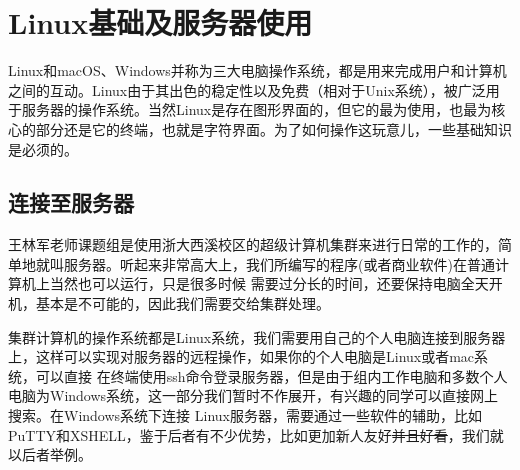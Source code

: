 \documentclass{article}
\numberwithin{equation}{section}
\begin{document}
    \section{Linux基础及服务器使用}
    Linux和macOS、Windows并称为三大电脑操作系统，都是用来完成用户和计算机之间的互动。Linux由于其出色的稳定性以及免费（相对于Unix系统），被广泛用于服务器的操作系统。当然Linux是存在图形界面的，但它的最为使用，也最为核心的部分还是它的终端，也就是字符界面。为了如何操作这玩意儿，一些基础知识是必须的。

    \subsection{连接至服务器}
    王林军老师课题组是使用浙大西溪校区的超级计算机集群来进行日常的工作的，简单地就叫服务器。听起来非常高大上，我们所编写的程序(或者商业软件)在普通计算机上当然也可以运行，只是很多时候
    需要过分长的时间，还要保持电脑全天开机，基本是不可能的，因此我们需要交给集群处理。

    集群计算机的操作系统都是Linux系统，我们需要用自己的个人电脑连接到服务器上，这样可以实现对服务器的远程操作，如果你的个人电脑是Linux或者mac系统，可以直接
    在终端使用ssh命令登录服务器，但是由于组内工作电脑和多数个人电脑为Windows系统，这一部分我们暂时不作展开，有兴趣的同学可以直接网上搜索。在Windows系统下连接
    Linux服务器，需要通过一些软件的辅助，比如PuTTY和XSHELL，鉴于后者有不少优势，比如更加新人友好\sout{并且好看}，我们就以后者举例。
\end{document}
